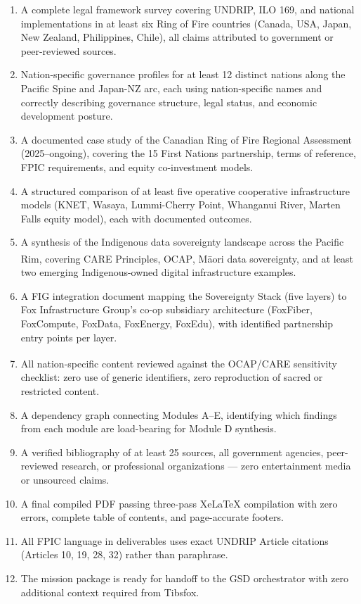 \documentclass[11pt,letterpaper]{article}
\begin{document}
\begin{enumerate}
  \item A complete legal framework survey covering UNDRIP, ILO 169, and national implementations in at least six Ring of Fire countries (Canada, USA, Japan, New Zealand, Philippines, Chile), all claims attributed to government or peer-reviewed sources.
  \item Nation-specific governance profiles for at least 12 distinct nations along the Pacific Spine and Japan-NZ arc, each using nation-specific names and correctly describing governance structure, legal status, and economic development posture.
  \item A documented case study of the Canadian Ring of Fire Regional Assessment (2025--ongoing), covering the 15 First Nations partnership, terms of reference, FPIC requirements, and equity co-investment models.
  \item A structured comparison of at least five operative cooperative infrastructure models (KNET, Wasaya, Lummi-Cherry Point, Whanganui River, Marten Falls equity model), each with documented outcomes.
  \item A synthesis of the Indigenous data sovereignty landscape across the Pacific Rim, covering CARE Principles, OCAP\textsuperscript{\textregistered}, Māori data sovereignty, and at least two emerging Indigenous-owned digital infrastructure examples.
  \item A FIG integration document mapping the Sovereignty Stack (five layers) to Fox Infrastructure Group's co-op subsidiary architecture (FoxFiber, FoxCompute, FoxData, FoxEnergy, FoxEdu), with identified partnership entry points per layer.
  \item All nation-specific content reviewed against the OCAP\textsuperscript{\textregistered}/CARE sensitivity checklist: zero use of generic identifiers, zero reproduction of sacred or restricted content.
  \item A dependency graph connecting Modules A--E, identifying which findings from each module are load-bearing for Module D synthesis.
  \item A verified bibliography of at least 25 sources, all government agencies, peer-reviewed research, or professional organizations --- zero entertainment media or unsourced claims.
  \item A final compiled PDF passing three-pass XeLaTeX compilation with zero errors, complete table of contents, and page-accurate footers.
  \item All FPIC language in deliverables uses exact UNDRIP Article citations (Articles 10, 19, 28, 32) rather than paraphrase.
  \item The mission package is ready for handoff to the GSD orchestrator with zero additional context required from Tibsfox.
\end{enumerate}
\end{document}
